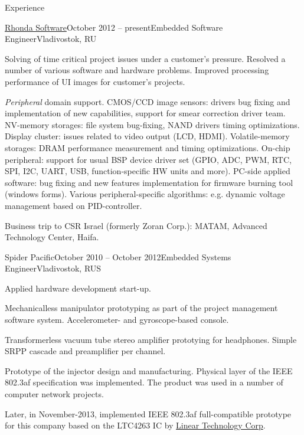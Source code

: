 \documentclass{template}
\begin{document}
\begin{rSection}{Experience}
\begin{rCompany}{\href{http://www.rhondasoftware.com}{Rhonda Software}}{October 2012 -- present}{Embedded Software Engineer}{Vladivostok, RU}
\item Solving of time critical project issues under a customer's pressure. Resolved a number of various  software and hardware
      problems. Improved processing performance of UI images for customer's projects.
\item \textit{Peripheral} domain support. CMOS/CCD image sensors: drivers bug fixing and implementation of new capabilities, support for smear
      correction driver team. NV-memory storages: file system bug-fixing, NAND drivers timing optimizations. Display cluster: issues related to
      video output (LCD, HDMI). Volatile-memory storages: DRAM performance measurement and timing optimizations. On-chip peripheral: support for
      usual BSP device driver set (GPIO, ADC, PWM, RTC, SPI, I2C, UART, USB, function-specific HW units and more). PC-side applied software: bug
      fixing and new features implementation for firmware burning tool (windows forms). Various peripheral-specific algorithms: e.g. dynamic
      voltage management based on PID-controller.
\item Business trip to CSR Israel (formerly Zoran Corp.): MATAM, Advanced Technology Center, Haifa. \newline

\end{rCompany}
\begin{rCompany}{Spider Pacific}{October 2010 -- October 2012}{Embedded Systems Engineer}{Vladivostok, RUS}

\item Applied hardware development start-up.
\item Mechanicalless manipulator prototyping as part of the project management software system. \newline Accelerometer- and gyroscope-based console.
\item Transformerless vacuum tube stereo amplifier prototying for headphones. \newline Simple SRPP cascade and preamplifier per channel.
\item Prototype of the  injector design and manufacturing. Physical layer of the IEEE
      802.3af specification was implemented. The product was used in a number of computer network projects.
\item Later, in November-2013, implemented IEEE 802.3af full-compatible prototype for this company based on the LTC4263 IC by
      \href{http://www.linear.com}{Linear Technology Corp}.

\end{rCompany}
\end{rSection}
\end{document}
